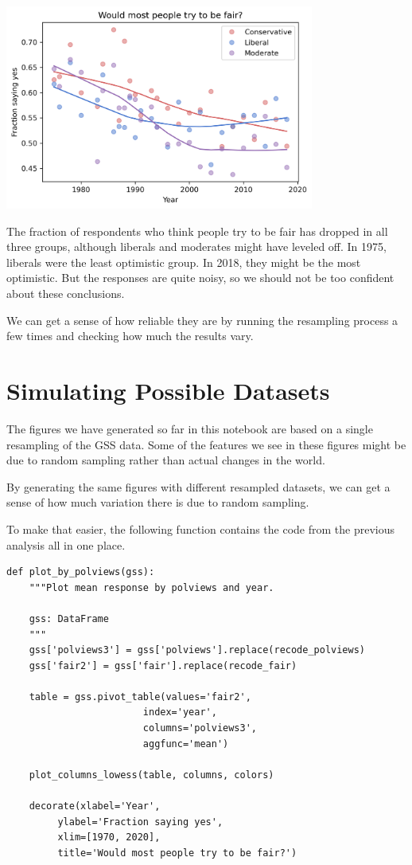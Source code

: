 \begin{center}
\includegraphics[width=4in]{chapters/03_outlook_files/03_outlook_55_0.png}
\end{center}

The fraction of respondents who think people try to be fair has dropped
in all three groups, although liberals and moderates might have leveled
off. In 1975, liberals were the least optimistic group. In 2018, they
might be the most optimistic. But the responses are quite noisy, so we
should not be too confident about these conclusions.

We can get a sense of how reliable they are by running the resampling
process a few times and checking how much the results vary.

\hypertarget{simulating-possible-datasets}{%
\section{Simulating Possible
Datasets}\label{simulating-possible-datasets}}

The figures we have generated so far in this notebook are based on a
single resampling of the GSS data. Some of the features we see in these
figures might be due to random sampling rather than actual changes in
the world.

By generating the same figures with different resampled datasets, we can
get a sense of how much variation there is due to random sampling.

To make that easier, the following function contains the code from the
previous analysis all in one place.

\begin{lstlisting}[]
def plot_by_polviews(gss):
    """Plot mean response by polviews and year.
    
    gss: DataFrame
    """
    gss['polviews3'] = gss['polviews'].replace(recode_polviews)
    gss['fair2'] = gss['fair'].replace(recode_fair)
    
    table = gss.pivot_table(values='fair2', 
                        index='year', 
                        columns='polviews3', 
                        aggfunc='mean')

    plot_columns_lowess(table, columns, colors)

    decorate(xlabel='Year',
         ylabel='Fraction saying yes',
         xlim=[1970, 2020],
         title='Would most people try to be fair?')
\end{lstlisting}

